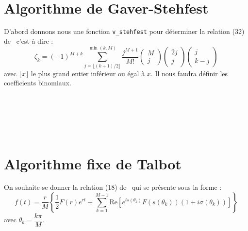 \section{Algorithme de Gaver-Stehfest}
D'abord donnons nous une fonction \texttt{v\_stehfest} pour déterminer 
la relation (32) de~\cite{abate2006} c'est à dire :
\[
\zeta_k = (-1)^{M+k} \sum_{j=\lfloor(k+1)/2\rfloor}^{\min{(k,M)}} 
\dfrac{j^{M+1}}{M!}\begin{pmatrix} M\\j  \end{pmatrix}
                   \begin{pmatrix} 2j\\j \end{pmatrix}
                   \begin{pmatrix} j\\k-j\end{pmatrix}
\]
avec $\lfloor x \rfloor$ le plus grand entier inférieur ou égal à $x$. Il 
nous faudra définir les coefficients binomiaux.

\inputminted{python}{codes/python/coeff_bin-annexe_invL.py}
\inputminted{python}{codes/python/1er_ordre-annexe_invL.py}
\inputminted{python}{codes/python/2nd_ordre-annexe_invL.py}
\inputminted{python}{codes/python/coeff_bin-annexe_invL.py}
\inputminted{python}{codes/python/gaver_stehfest-annexe_invL.py}
\inputminted{python}{codes/python/talbot-annexe_invL.py}
\inputminted{python}{codes/python/v_stehfest-annexe_invL.py}


\section{Algorithme fixe de Talbot}
On souhaite se donner la relation (18) de~\cite{abate2004} 
qui se présente sous la forme :
\[
f(t) = \dfrac{r}{M} 
\left\{ 
    \dfrac{1}{2} F(r) e^{rt}+ \sum_{k=1}^{M-1} 
    \textrm{Re}\left[ e^{ts(\theta_k)} F(s(\theta_k)) (1+i\sigma(\theta_k))\right]
\right\}
\]
avec $\theta_k=\dfrac{k\pi}{M}$.

